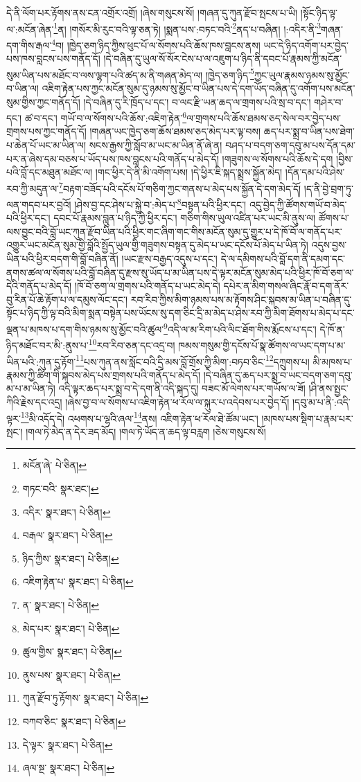 དེ་ནི་ལོག་པར་རྟོགས་ནས་ངན་འགྲོར་འགྲོ། །ཞེས་གསུངས་སོ། །གཞན་དུ་ཀུན་རྫོབ་སྤངས་པ་ཡི། །སྟོང་ཉིད་ལྟ་ལ་:མངོན་ཞེན་\footnote{མངོན་ཞེ་  པེ་ཅིན། }ན། །གསོར་མི་རུང་བའི་ལྟ་ཅན་ཏེ། །སྨན་པས་:བཏང་བའི་\footnote{གཏང་བའི་  སྣར་ཐང་། }ནད་པ་བཞིན། །:འདིར་ནི་\footnote{འདིར་  སྣར་ཐང་།  པེ་ཅིན། }གཞན་དག་གིས་རྒལ་\footnote{བརྒལ་  སྣར་ཐང་།  པེ་ཅིན། }བ། །ཁྱེད་ཅག་ཉིད་ཀྱིས་ཕུང་པོ་ལ་སོགས་པའི་ཆོས་ཁས་བླངས་ནས། ཡང་དེ་ཉིད་འགོག་པར་བྱེད་པས་ཁས་བླངས་པས་གནོད་དོ། །དེ་བཞིན་དུ་ཡུལ་སོ་སོར་ངེས་པ་ལ་འཇུག་པ་ཉིད་ནི་དབང་པོ་རྣམས་ཀྱི་མངོན་སུམ་ཡིན་པས་མཐོང་བ་ལས་ལྷག་པའི་ཚད་མ་ནི་གཞན་མེད་ལ། །ཁྱེད་ཅག་ཉིད་\footnote{ཉིད་ཀྱིས་  སྣར་ཐང་།  པེ་ཅིན། }ཀྱང་ཡུལ་རྣམས་ཉམས་སུ་མྱོང་བ་ཡིན་ལ། འཇིག་རྟེན་པས་ཀྱང་མངོན་སུམ་དུ་ཉམས་སུ་མྱོང་བ་ཡིན་པས་དེ་དག་ཡོད་བཞིན་དུ་འགོག་པས་མངོན་སུམ་གྱིས་ཀྱང་གནོད་དོ། །དེ་བཞིན་དུ་རི་ཁྲོད་པ་དང་། བ་ལང་རྫི་ཡན་ཆད་ལ་གྲགས་པའི་སྲ་བ་དང་། གཤེར་བ་དང་། ཚ་བ་དང་། གཡོ་བ་ལ་སོགས་པའི་ཆོས་:འཇིག་རྟེན་\footnote{འཇིག་རྟེན་པ་  སྣར་ཐང་།  པེ་ཅིན། }ལ་གྲགས་པའི་ཆོས་ཐམས་ཅད་སེལ་བར་བྱེད་པས་གྲགས་པས་ཀྱང་གནོད་དོ། །གཞན་ཡང་ཁྱེད་ཅག་ཆོས་ཐམས་ཅད་མེད་པར་ལྟ་བས། ཆད་པར་སྨྲ་བ་ཡིན་པས་ཐེག་པ་ཆེན་པོ་ཡང་མ་ཡིན་ལ། སངས་རྒྱས་ཀྱི་སློབ་མ་ཡང་མ་ཡིན་ནོ་ཞེ་ན། བཤད་པ་བདག་ཅག་དབུ་མ་པས་དོན་དམ་པར་ན་ཞེས་དམ་བཅས་པ་ཡོད་པས་ཁས་བླངས་པའི་གནོད་པ་མེད་དོ། །གཟུགས་ལ་སོགས་པའི་ཆོས་དེ་དག །བྱིས་པའི་བློ་དང་མཐུན་མཐོང་ལ། །གང་ཕྱིར་དེ་ནི་མི་འགོག་པས། །དེ་ཕྱིར་ཇི་སྐད་སྨྲས་སྐྱོན་མེད། །དོན་དམ་པའི་ཤེས་རབ་ཀྱི་མདུན་ལ་\footnote{ན་  སྣར་ཐང་།  པེ་ཅིན། }བརྟག་བཟོད་པའི་དངོས་པོ་གཅིག་ཀྱང་གནས་པ་མེད་པས་སྐྱོན་དེ་དག་མེད་དོ། །ད་ནི་བྱེ་བྲག་ཏུ་ལན་གདབ་པར་བྱའོ། །ཤེས་བྱ་དང་ཤེས་པ་སྐྱེ་བ་:མེད་པ་\footnote{མེད་པར་  སྣར་ཐང་།  པེ་ཅིན། }བསྟན་པའི་ཕྱིར་དང་། འདུ་བྱེད་ཀྱི་ཚོགས་གཡོ་བ་མེད་པའི་ཕྱིར་དང་། དབང་པོ་རྣམས་བླུན་པ་ཉིད་ཀྱི་ཕྱིར་དང་། གཅིག་གིས་ཡུལ་འཛིན་པར་ཡང་མི་ནུས་ལ། ཚོགས་པ་ལས་བྱུང་བའི་བློ་ཡང་ཀུན་རྫོབ་ཡིན་པའི་ཕྱིར་གང་ཞིག་གང་གིས་མངོན་སུམ་དུ་གྱུར་པ་དེ་ཁོ་བོ་ལ་གནོད་པར་འགྱུར་ཡང་མངོན་སུམ་གྱི་བློའི་སྤྱོད་ཡུལ་གྱི་གཟུགས་བསྟན་དུ་མེད་པ་ཡང་དངོས་པོ་མེད་པ་ཡིན་ཏེ། འདུས་བྱས་ཡིན་པའི་ཕྱིར་བདག་གི་བློ་བཞིན་ནོ། །ཡང་རྫས་བརྒྱད་འདུས་པ་དང་། དེ་ལ་དམིགས་པའི་བློ་དག་ནི་དམག་དང་ནགས་ཚལ་ལ་སོགས་པའི་བློ་བཞིན་དུ་རྫས་སུ་ཡོད་པ་མ་ཡིན་པས་དེ་ལྟར་མངོན་སུམ་མེད་པའི་ཕྱིར་ཁོ་བོ་ཅག་ལ་དེའི་གནོད་པ་མེད་དོ། །ཁོ་བོ་ཅག་ལ་གྲགས་པའི་གནོད་པ་ཡང་མེད་དེ། དཔེར་ན་མིག་གསལ་ཞིང་རྣོ་བ་དག་ནོར་བུ་རིན་པོ་ཆེ་རྟོག་པ་ལ་དམུས་ལོང་དང་། རབ་རིབ་ཀྱིས་མིག་ཉམས་པས་མ་རྟོགས་ཤིང་སྐབས་མ་ཡིན་པ་བཞིན་དུ་སྟོང་པ་ཉིད་ཀྱི་ལྟ་བའི་མིག་སྨན་བསྟེན་པས་ཡོངས་སུ་དག་ཅིང་དྲི་མ་མེད་པ་ཤེས་རབ་ཀྱི་མིག་ཐོགས་པ་མེད་པ་དང་ལྡན་པ་མཁས་པ་དག་གིས་ཉམས་སུ་མྱོང་བའི་ཚུལ་\footnote{ཚུལ་གྱིས་  སྣར་ཐང་།  པེ་ཅིན། }འདི་ལ་མ་རིག་པའི་ལིང་ཐོག་གིས་རྨོངས་པ་དང་། དེ་ཁོ་ན་ཉིད་མཐོང་བར་མི་:ནུས་པ་\footnote{ནུས་པས་  སྣར་ཐང་།  པེ་ཅིན། }རབ་རིབ་ཅན་དང་འདྲ་བ། ཁམས་གསུམ་གྱི་དངོས་པོ་སྣ་ཚོགས་ལ་ཡང་དག་པ་མ་ཡིན་པའི་:ཀུན་དུ་རྟོག་\footnote{ཀུན་རྫོབ་ཏུ་རྟོགས་  སྣར་ཐང་།  པེ་ཅིན། }པས་ཀུན་ནས་སློང་བའི་དྲི་མས་བློ་གྲོས་ཀྱི་མིག་:བཏབ་ཅིང་\footnote{བཀབ་ཅིང་  སྣར་ཐང་།  པེ་ཅིན། }དཀྲུགས་པ། མི་མཁས་པ་རྣམས་ཀྱི་ཚིག་གི་སྐབས་མེད་པས་གྲགས་པའི་གནོད་པ་མེད་དོ། །དེ་བཞིན་དུ་ཆད་པར་སྨྲ་བ་ཡང་བདག་ཅག་དབུ་མ་པ་མ་ཡིན་ཏེ། འདི་ལྟར་ཆད་པར་སྨྲ་བ་དེ་དག་ནི་འདི་སྐད་དུ། བཟང་མོ་ལེགས་པར་གཡོས་ལ་ཟོ། །ཤི་ནས་སྤྱང་ཀིའི་རྗེས་དང་འདྲ། །ཞེས་བྱ་བ་ལ་སོགས་པ་འཇིག་རྟེན་ཕ་རོལ་ལ་སྐུར་པ་འདེབས་པར་བྱེད་དོ། །དབུ་མ་པ་ནི་:འདི་ལྟར་\footnote{དེ་ལྟར་  སྣར་ཐང་།  པེ་ཅིན། }མི་འདོད་དེ། འཕགས་པ་ལྷའི་ཞལ་\footnote{ཞལ་སྔ་  སྣར་ཐང་།  པེ་ཅིན། }ནས། འཇིག་རྟེན་ཕ་རོལ་ཐེ་ཚོམ་ཡང་། །མཁས་པས་སྡིག་པ་རྣམ་པར་སྤང་། །གལ་ཏེ་མེད་ན་དེར་ཟད་མོད། །གལ་ཏེ་ཡོད་ན་ཆད་ལྟ་བརླག །ཅེས་གསུངས་སོ། 
